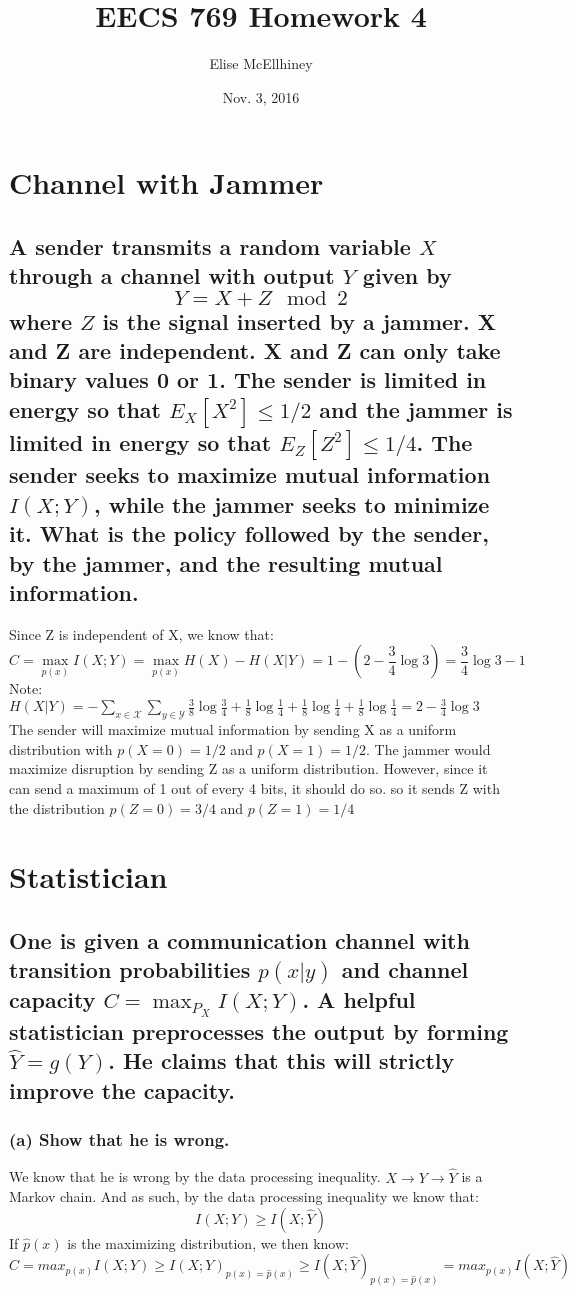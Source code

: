 \documentclass[11pt, oneside]{book}   	%
\title{EECS 769 Homework 4}
\author{Elise McEllhiney}
\date{Nov. 3, 2016}							%
\begin{document}
\maketitle

\section{Channel with Jammer}
\subsection*{A sender transmits a random variable $X$ through a channel with output $Y$ given by
$$Y=X+Z \mod 2$$
where $Z$ is the signal inserted by a jammer.  X and Z are independent.  X and Z can only take binary values 0 or 1.  The sender is limited in energy so that $E_X[X^2] \leq 1/2$ and the jammer is limited in energy so that $E_Z[Z^2] \leq 1/4$.  The sender seeks to maximize mutual information $I(X;Y)$, while the jammer seeks to minimize it.  What is the policy followed by the sender, by the jammer, and the resulting mutual information.}
Since Z is independent of X, we know that:
$$C=\max_{p(x)}I(X;Y)=\max_{p(x)}H(X)-H(X|Y)=1-(2-\frac{3}{4}\log{3})=\frac{3}{4}\log{3}-1$$
Note: $H(X|Y)=-\sum_{x\in \mathcal{X}}\sum_{y\in \mathcal{Y}} \frac{3}{8}\log{\frac{3}{4}} + \frac{1}{8}\log{\frac{1}{4}} + \frac{1}{8}\log{\frac{1}{4}} + \frac{1}{8}\log{\frac{1}{4}} = 2-\frac{3}{4}\log{3}$\\
The sender will maximize mutual information by sending X as a uniform distribution with $p(X=0)=1/2$ and $p(X=1)=1/2$.
The jammer would maximize disruption by sending Z as a uniform distribution.  However, since it can send a maximum of 1 out of every 4 bits, it should do so.  so it sends Z with the distribution $p(Z=0)=3/4$ and $p(Z=1)=1/4$

\section{Statistician}
\subsection*{One is given a communication channel with transition probabilities $p(x|y)$ and channel capacity $C = \max_{P_X} I(X;Y)$.  A helpful statistician preprocesses the output by forming $\hat{Y}=g(Y)$.  He claims that this will strictly improve the capacity.}
\subsubsection{(a) Show that he is wrong.}
We know that he is wrong by the data processing inequality.  $X \rightarrow Y \rightarrow \hat{Y}$ is a Markov chain.  And as such, by the data processing inequality we know that:
$$I(X;Y) \geq I(X;\hat{Y})$$
If $\hat{p}(x)$ is the maximizing distribution, we then know:
$$C=max_{p(x)}I(X;Y) \geq I(X;Y)_{p(x)=\hat{p}(x)} \geq I(X;\hat{Y})_{p(x)=\hat{p}(x)}=max_{p(x)}I(X;\hat{Y})$$
\end{document}
